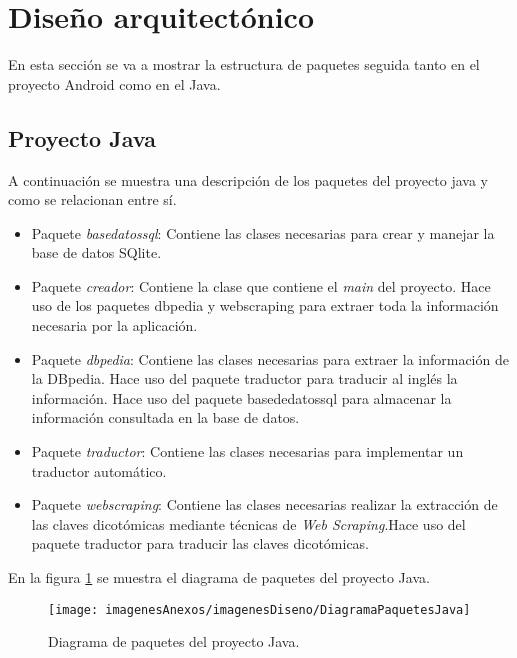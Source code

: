 \section{Diseño arquitectónico}

En esta sección se va a mostrar la estructura de paquetes seguida tanto en el proyecto Android como en el Java.

\subsection{Proyecto Java}

A continuación se muestra una descripción de los paquetes del proyecto java y como se relacionan entre sí.

\begin{itemize}
	\item Paquete \textit{basedatossql}: Contiene las clases necesarias para crear y manejar la base de datos SQlite.
	\item Paquete \textit{creador}: Contiene la clase que contiene el \textit{main} del proyecto. Hace uso de los paquetes dbpedia y webscraping para extraer toda la información necesaria por la aplicación.
	\item Paquete \textit{dbpedia}: Contiene las clases necesarias para extraer la información de la DBpedia. Hace uso del paquete traductor para traducir al inglés la información. Hace uso del paquete basededatossql para almacenar la información consultada en la base de datos.
	\item Paquete \textit{traductor}: Contiene las clases necesarias para implementar un traductor automático.
	\item Paquete \textit{webscraping}: Contiene las clases necesarias realizar la extracción de las claves dicotómicas mediante técnicas de \textit{Web Scraping}.Hace uso del paquete traductor para traducir las claves dicotómicas.
\end{itemize}

En la figura \ref{figDiagramaPaquetesJava} se muestra el diagrama de paquetes del proyecto Java.

\begin{figure}[h]
    \begin{center}%
        \begin{center}%
          \texttt{[image: imagenesAnexos/imagenesDiseno/DiagramaPaquetesJava]}%
          \caption{Diagrama de paquetes del proyecto Java.}%
          \label{figDiagramaPaquetesJava}%
        \end{center}%
  	\end{center}%
\end{figure}%

